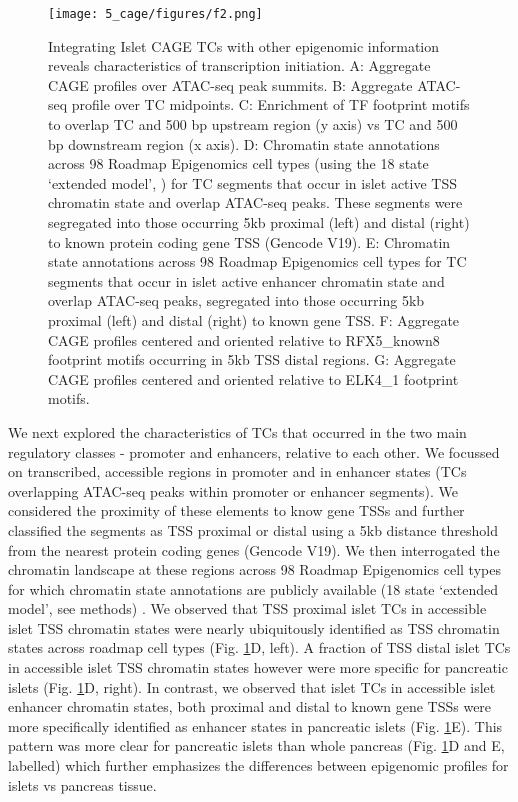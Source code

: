 \begin{figure}
        \centering
        \texttt{[image: 5\_cage/figures/f2.png]}
        \caption[Integrating Islet CAGE TCs with other epigenomic information reveals characteristics of transcription initiation]{Integrating Islet CAGE TCs with other epigenomic information reveals characteristics of transcription initiation. A: Aggregate CAGE profiles over ATAC-seq peak summits. B: Aggregate ATAC-seq profile over TC midpoints. C: Enrichment of TF footprint motifs to overlap TC and 500 bp upstream region (y axis) vs TC and 500 bp downstream region (x axis). D: Chromatin state annotations across 98 Roadmap Epigenomics cell types (using the 18 state ‘extended model’, \cite{theroadmapepigenomicsconsortiumIntegrativeAnalysis1112015}) for TC segments that occur in islet active TSS chromatin state and overlap ATAC-seq peaks. These segments were segregated into those occurring 5kb proximal (left) and distal (right) to known protein coding gene TSS (Gencode V19). E: Chromatin state annotations across 98 Roadmap Epigenomics cell types for TC segments that occur in islet active enhancer chromatin state and overlap ATAC-seq peaks, segregated into those occurring 5kb proximal (left) and distal (right) to known gene TSS. F: Aggregate CAGE profiles centered and oriented relative to RFX5\_known8 footprint motifs occurring in 5kb TSS distal regions. G: Aggregate CAGE profiles centered and oriented relative to ELK4\_1 footprint motifs.}
        \label{fig:c5_f2}
\end{figure}


We next explored the characteristics of TCs that occurred in the two main regulatory classes - promoter and enhancers, relative to each other. We focussed on transcribed, accessible regions in promoter and in enhancer states (TCs overlapping ATAC-seq peaks within promoter or enhancer segments). We considered the proximity of these elements to know gene TSSs and further classified the segments as TSS proximal or distal using a 5kb distance threshold from the nearest protein coding genes (Gencode V19). We then interrogated the chromatin landscape at these regions across 98 Roadmap Epigenomics cell types for which chromatin state annotations are publicly available (18 state ‘extended model’, see methods) \cite{theroadmapepigenomicsconsortiumIntegrativeAnalysis1112015}. We observed that TSS proximal islet TCs in accessible islet TSS chromatin states were nearly ubiquitously identified as TSS chromatin states across roadmap cell types (Fig. \ref{fig:c5_f2}D, left). A fraction of TSS distal islet TCs in accessible islet TSS chromatin states however were more specific for pancreatic islets (Fig. \ref{fig:c5_f2}D, right). In contrast, we observed that islet TCs in accessible islet enhancer chromatin states, both proximal and distal to known gene TSSs were more specifically identified as enhancer states in pancreatic islets (Fig. \ref{fig:c5_f2}E). This pattern was more clear for pancreatic islets than whole pancreas (Fig. \ref{fig:c5_f2}D and E, labelled) which further emphasizes the differences between epigenomic profiles for islets vs pancreas tissue. 


